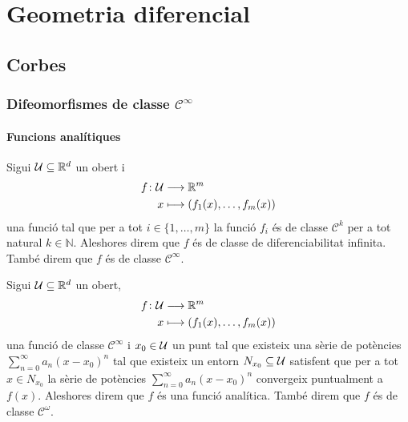 \documentclass[../Apunts.tex]{subfiles}
\begin{document}
\part{Geometria diferencial}
\chapter{Corbes}
	\section{Difeomorfismes de classe \ensuremath{\mathcal{C}^{\infty}}}
	\subsection{Funcions analítiques}
	\begin{definition}
		\label{def:classe de diferenciabilitat infinita}
		Sigui \(\mathcal{U}\subseteq\mathbb{R}^{d}\) un obert i
		\begin{align*}
			f\colon\mathcal{U}&\longrightarrow\mathbb{R}^{m} \\
			x&\longmapsto(f_{1}(x),\dots,f_{m}(x))
		\end{align*}
		una funció tal que per a tot \(i\in\{1,\dots,m\}\) la funció \(f_{i}\) és de classe \(\mathcal{C}^{k}\) per a tot natural \(k\in\mathbb{N}\). Aleshores direm que \(f\) és de classe de diferenciabilitat infinita. També direm que \(f\) és de classe \(\mathcal{C}^{\infty}\).
	\end{definition}
	\begin{definition}
		\label{def:funció analítica}
		Sigui \(\mathcal{U}\subseteq\mathbb{R}^{d}\) un obert,
		\begin{align*}
			f\colon\mathcal{U}&\longrightarrow\mathbb{R}^{m} \\
			x&\longmapsto(f_{1}(x),\dots,f_{m}(x))
		\end{align*}
		una funció de classe \(\mathcal{C}^{\infty}\) i \(x_{0}\in\mathcal{U}\) un punt tal que existeix una sèrie de potències \(\sum_{n=0}^{\infty}a_{n}(x-x_{0})^{n}\) tal que existeix un entorn \(N_{x_{0}}\subseteq\mathcal{U}\) satisfent que per a tot \(x\in N_{x_{0}}\) la sèrie de potències \(\sum_{n=0}^{\infty}a_{n}(x-x_{0})^{n}\) convergeix puntualment a \(f(x)\). Aleshores direm que \(f\) és una funció analítica. També direm que \(f\) és de classe \(\mathcal{C}^{\omega}\).
	\end{definition}
\end{document}
